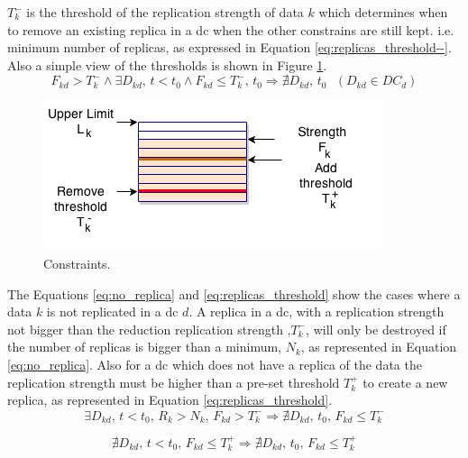 \documentclass[english]{article}
\begin{document}
$T^{-}_{k}$ is the threshold of the replication strength of data $k$ which determines when to remove an existing replica in a \gls{dc} when the other constrains are still kept. i.e. minimum number of replicas, as expressed in Equation \ref{eq:replicas_threshold--}. Also a simple view of the thresholds is shown in Figure \ref{fig:lim_constriants}.
\begin{equation} \label{eq:replicas_threshold--}
	F_{kd} > T^{-}_{k} \wedge \exists D_{kd} \text{, } t < t_{0}  \wedge F_{kd} \le T^{-}_{k} \text{, } t_{0} \Longrightarrow \nexists D_{kd} \text{, } t_{0} \text{ } (D_{kd} \in DC_{d})
\end{equation}
\begin{center}
	\begin{figure}[ht!]
		\centering
		\includegraphics[width=.8\textwidth]{figures/strengthReplica.png}
	
		\caption{Constraints.}
		\label{fig:lim_constriants}
	\end{figure}
\end{center}

The Equations \ref{eq:no_replica} and \ref{eq:replicas_threshold} show the cases where a data $k$ is not replicated in a \gls{dc} $d$.  A replica in a \gls{dc}, with a replication strength not bigger than the reduction replication strength ,$T^{-}_{k}$, will only be destroyed if the number of replicas is bigger than a minimum, $N_{k}$, as represented in Equation \ref{eq:no_replica}. Also for a \gls{dc} which does not have a replica of the data the replication strength must be higher than a pre-set threshold $T^{+}_{k}$ to create a new replica, as represented in Equation \ref{eq:replicas_threshold}.
\begin{equation} \label{eq:no_replica}
	\exists D_{kd} \text{, } t < t_{0} \text{, } R_{k} > N_{k} \text{, } F_{kd} > T^{-}_{k} \Longrightarrow \nexists D_{kd} \text{, } t_{0} \text{, } F_{kd} \le T^{-}_{k}
\end{equation}

\begin{equation} \label{eq:replicas_threshold}
	\nexists D_{kd} \text{, } t < t_{0} \text{, } F_{kd} \le T^{+}_{k} \Longrightarrow \nexists D_{kd} \text{, } t_{0} \text{, } F_{kd} \le T^{+}_{k}
\end{equation}
\end{document}
